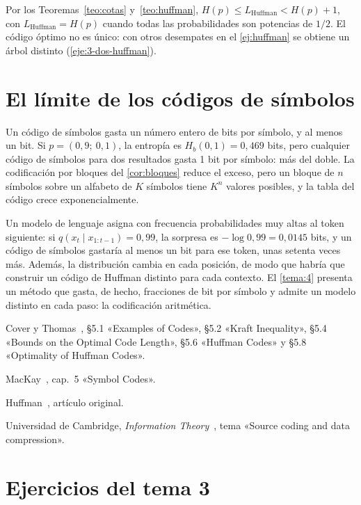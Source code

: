 Por los Teoremas~\ref{teo:cotas} y~\ref{teo:huffman}, $H(p)\le L_{\text{Huffman}}<H(p)+1$, con $L_{\text{Huffman}}=H(p)$ cuando todas las probabilidades son potencias de $1/2$. El código óptimo no es único: con otros desempates en el \cref{ej:huffman} se obtiene un árbol distinto (\cref{eje:3-dos-huffman}).

\section{El límite de los códigos de símbolos}

Un código de símbolos gasta un número entero de bits por símbolo, y al menos un bit. Si $p=(0{,}9;\ 0{,}1)$, la entropía es $H_b(0{,}1)=0{,}469$ bits, pero cualquier código de símbolos para dos resultados gasta 1 bit por símbolo: más del doble. La codificación por bloques del \cref{cor:bloques} reduce el exceso, pero un bloque de $n$ símbolos sobre un alfabeto de $K$ símbolos tiene $K^{n}$ valores posibles, y la tabla del código crece exponencialmente.

\begin{observacion}
Un modelo de lenguaje asigna con frecuencia probabilidades muy altas al token siguiente: si $q(x_t\mid x_{1:t-1})=0{,}99$, la sorpresa es $-\log 0{,}99=0{,}0145$ bits, y un código de símbolos gastaría al menos un bit para ese token, unas setenta veces más. Además, la distribución cambia en cada posición, de modo que habría que construir un código de Huffman distinto para cada contexto. El \cref{tema:4} presenta un método que gasta, de hecho, fracciones de bit por símbolo y admite un modelo distinto en cada paso: la codificación aritmética.
\end{observacion}

\begin{lecturas}
\item Cover y Thomas~\cite{ct}, §5.1 «Examples of Codes», §5.2 «Kraft Inequality», §5.4 «Bounds on the Optimal Code Length», §5.6 «Huffman Codes» y §5.8 «Optimality of Huffman Codes».
\item MacKay~\cite{mackay}, cap.~5 «Symbol Codes».
\item Huffman~\cite{huffman}, artículo original.
\item Universidad de Cambridge, \emph{Information Theory}~\cite{camit}, tema «Source coding and data compression».
\end{lecturas}

\section*{Ejercicios del tema 3}

